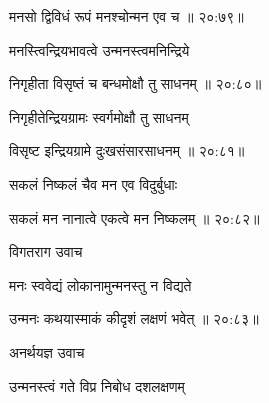 
{\devanagarifont मनसो द्विविधं रूपं मनश्चोन्मन एव च {॥ २०:७९॥} \veg\dontdisplaylinenum }%

{\devanagarifont मनस्त्विन्द्रियभावत्वे उन्मनस्त्वमनिन्द्रिये \thinspace{\dandab} \dontdisplaylinenum }%


{\devanagarifont निगृहीता विसृष्तं च बन्धमोक्षौ तु साधनम् {॥ २०:८०॥} \veg\dontdisplaylinenum }%

{\devanagarifont निगृहीतेन्द्रियग्रामः स्वर्गमोक्षौ तु साधनम् \thinspace{\dandab} \dontdisplaylinenum }%
 

{\devanagarifont विसृष्ट इन्द्रियग्रामे दुःखसंसारसाधनम् {॥ २०:८१॥} \veg\dontdisplaylinenum }%

{\devanagarifont सकलं निष्कलं चैव मन एव विदुर्बुधाः \thinspace{\dandab} \dontdisplaylinenum }%


{\devanagarifont सकलं मन नानात्वे एकत्वे मन निष्कलम् {॥ २०:८२॥} \veg\dontdisplaylinenum }%
 
{\devanagarifont विगतराग उवाच {\dandab}\dontdisplaylinenum  }%
 
{\devanagarifont मनः स्ववेद्यं लोकानामुन्मनस्तु न विद्यते \thinspace{\danda} \dontdisplaylinenum }%


{\devanagarifont उन्मनः कथयास्माकं कीदृशं लक्षणं भवेत् {॥ २०:८३॥} \veg\dontdisplaylinenum }%
 
{\devanagarifont अनर्थयज्ञ उवाच {\dandab}\dontdisplaylinenum  }%
 
{\devanagarifont उन्मनस्त्वं गते विप्र निबोध दशलक्षणम् \thinspace{\danda} \dontdisplaylinenum }%

